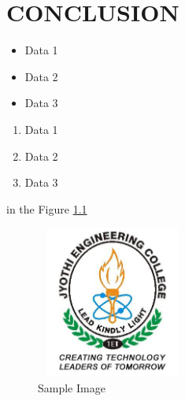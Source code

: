 \chapter{CONCLUSION}




\begin{itemize}
\item Data 1
\item Data 2
\item Data 3
\end{itemize}


\begin{enumerate}
\item Data 1
\item Data 2
\item Data 3
\end{enumerate}



in the Figure \ref{1}

\begin{figure}[h!]
\centering
\includegraphics[width=5cm, height=5cm]{fig/logo1.jpg}
\caption{Sample Image}
\label{1}
\end{figure}